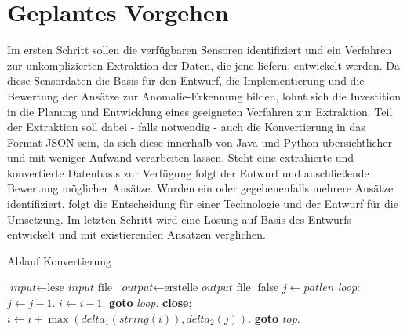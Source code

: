 \section{Geplantes Vorgehen}
Im ersten Schritt sollen die verfügbaren Sensoren identifiziert und ein Verfahren zur unkomplizierten Extraktion der Daten, die jene liefern, entwickelt werden. Da diese Sensordaten die Basis für den Entwurf, die Implementierung und die Bewertung der Ansätze zur Anomalie-Erkennung bilden, lohnt sich die Investition in die Planung und Entwicklung eines geeigneten Verfahren zur Extraktion. Teil der Extraktion soll dabei - falls notwendig - auch die Konvertierung in das Format JSON sein, da sich diese innerhalb von Java und Python übersichtlicher und mit weniger Aufwand verarbeiten lassen. \newline
Steht eine extrahierte und konvertierte Datenbasis zur Verfügung folgt der Entwurf und anschließende Bewertung möglicher Ansätze. Wurden ein oder gegebenenfalls mehrere Ansätze identifiziert, folgt die Entscheidung für einer Technologie und der Entwurf für die Umsetzung. Im letzten Schritt wird eine Lösung auf Basis des Entwurfs entwickelt und mit existierenden Ansätzen verglichen.

\begin{algorithm}
\caption{Ablauf Konvertierung}\label{euclid}
\begin{algorithmic}[1]
\State $\textit{input} \gets \text{lese }\textit{input }\text{file}$
\State $\textit{output} \gets \text{erstelle } \textit{output } \text{file}$
 \Return false
\EndIf
\State $j \gets \textit{patlen}$
\BState \emph{loop}:
\State $j \gets j-1$.
\State $i \gets i-1$.
\State \textbf{goto} \emph{loop}.
\State \textbf{close};
\EndIf
\State $i \gets i+\max(\textit{delta}_1(\textit{string}(i)),\textit{delta}_2(j))$.
\State \textbf{goto} \emph{top}.
\end{algorithmic}
\end{algorithm}